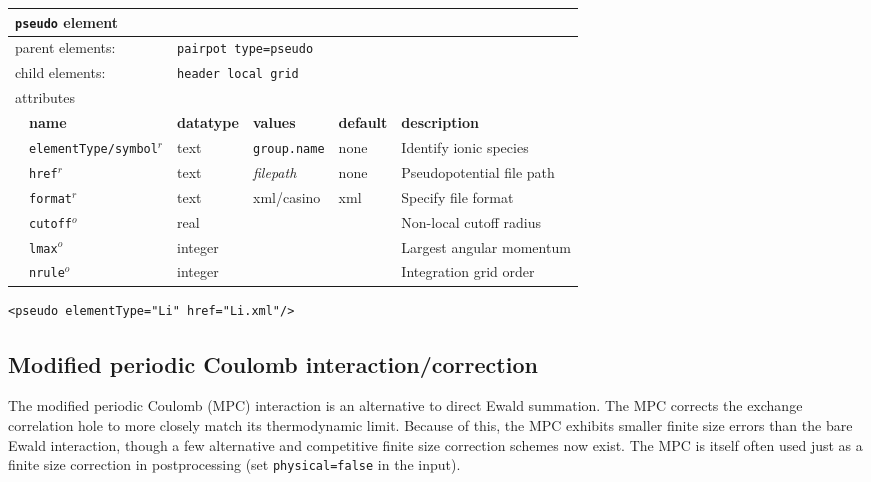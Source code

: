 \begin{table}[h]
\begin{center}
\begin{tabularx}{\textwidth}{l l l l l l }
\hline
\multicolumn{6}{l}{\texttt{pseudo} element} \\
\hline
\multicolumn{2}{l}{parent elements:} & \multicolumn{4}{l}{\texttt{pairpot type=pseudo}}\\
\multicolumn{2}{l}{child  elements:} & \multicolumn{4}{l}{\texttt{header local grid}}\\
\multicolumn{2}{l}{attributes}  & \multicolumn{4}{l}{}\\
   &   \bfseries name     & \bfseries datatype & \bfseries values & \bfseries default   & \bfseries description \\
   & \texttt{elementType/symbol}$^r$&  text    &\texttt{group.name}& none               & Identify ionic species   \\
   & \texttt{href}$^r$    &  text              & \textit{filepath}& none                & Pseudopotential file path\\
   & \texttt{format}$^r$  &  text              & xml/casino       & xml                 & Specify file format\\
   & \texttt{cutoff}$^o$  &  real              &                  &                     & Non-local cutoff radius  \\
   & \texttt{lmax}$^o$    &  integer           &                  &                     & Largest angular momentum  \\
   & \texttt{nrule}$^o$   &  integer           &                  &                     & Integration grid order             \\
  \hline
\end{tabularx}
\end{center}
\end{table}
\FloatBarrier


\begin{lstlisting}[caption=XML element for pseudopotential of single ionic species.]
  <pseudo elementType="Li" href="Li.xml"/>
\end{lstlisting}



\subsection{Modified periodic Coulomb interaction/correction}

The modified periodic Coulomb (MPC) interaction is an alternative to direct Ewald summation.  The MPC corrects the exchange correlation hole to more closely match its thermodynamic limit.  Because of this, the MPC exhibits smaller finite size errors than the bare Ewald interaction, though a few alternative and competitive finite size correction schemes now exist.  The MPC is itself often used just as a finite size correction in postprocessing (set \texttt{physical=false} in the input).  


